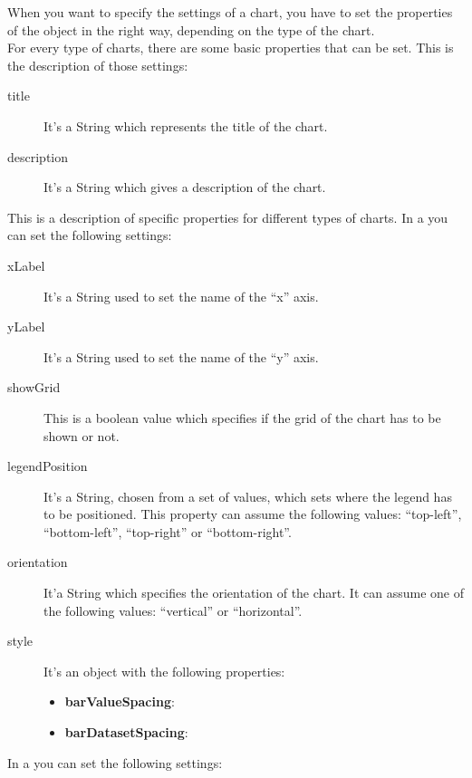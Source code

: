 		When you want to specify the settings of a chart, you have to set the properties of the  object in the right way, depending on the type of the chart.\\
		For every type of charts, there are some basic properties that can be set. This is the description of those settings:
		\begin{description}
			\item[title] It's a String which represents the title of the chart.
			\item[description] It's a String which gives a description of the chart.
		\end{description}
		This is a description of specific properties for different types of charts.
			In a  you can set the following settings:
			\begin{description}
				\item[xLabel] It's a String used to set the name of the “x” axis.
				\item[yLabel] It's a String used to set the name of the “y” axis.
				\item[showGrid] This is a boolean value which specifies if the grid of the chart has to be shown or not.
				\item[legendPosition] It's a String, chosen from a set of values, which sets where the legend has to be positioned. This property can assume the following values: “top-left”, “bottom-left”, “top-right” or “bottom-right”.
				\item[orientation] It'a String which specifies the orientation of the chart. It can assume one of the following values: “vertical” or “horizontal”.
				\item[style] It's an object with the following properties:
				\begin{itemize}
					\item \textbf{barValueSpacing}: 
					\item \textbf{barDatasetSpacing}:
				\end{itemize}
			\end{description}
			In a  you can set the following settings:
